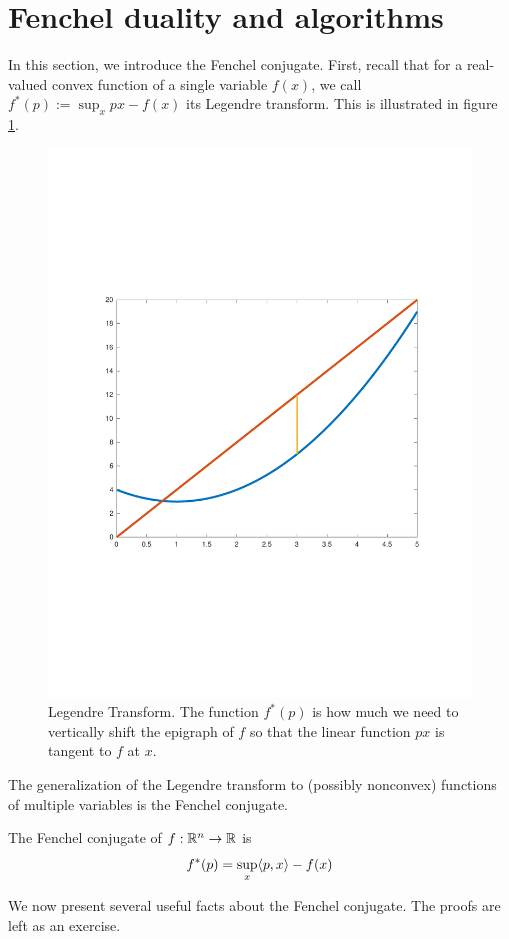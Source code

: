\section{Fenchel duality and algorithms}

In this section, we introduce the Fenchel conjugate. First, recall that for a real-valued convex function of a single variable $f(x)$, we call $f^*(p) := \sup_x px - f(x)$ its Legendre transform. This is illustrated in figure \ref{fig:leg-conj}.

\begin{figure}[h]
    \centering
    \includegraphics[width=.75\textwidth, trim = 0 200 0 200, clip]{figures/lecture15-conjugate.pdf}
    \caption{Legendre Transform. The function $f^*(p)$ is how much we need to vertically shift the epigraph of $f$ so that the linear function $px$ is tangent to $f$ at $x$.}
    \label{fig:leg-conj}
\end{figure}

The generalization of the Legendre transform to (possibly nonconvex) functions of multiple variables is the Fenchel conjugate.
\begin{definition}
The Fenchel conjugate of $f:\mathbb{R}^n \to \mathbb{R}$ is \[f^*(p) = \sup_x \langle p,x\rangle - f(x)\]
\end{definition}

We now present several useful facts about the Fenchel conjugate. The proofs are left as an exercise.

